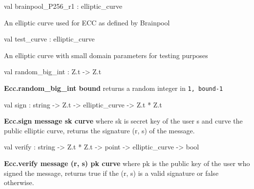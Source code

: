 \documentclass[12pt]{article}
\begin{document}
\begin{ocamldocsigend}
\label{val:Ecc.Ecc.brainpool-underscoreP256-underscorer1}\begin{ocamldoccode}
val brainpool_P256_r1 : elliptic_curve
\end{ocamldoccode}
\begin{ocamldocdescription}
An elliptic curve used for ECC as defined by Brainpool


\end{ocamldocdescription}


\label{val:Ecc.Ecc.test-underscorecurve}\begin{ocamldoccode}
val test_curve : elliptic_curve
\end{ocamldoccode}
\begin{ocamldocdescription}
An elliptic curve with small domain parameters for testing purposes


\end{ocamldocdescription}


\label{val:Ecc.Ecc.random-underscorebig-underscoreint}\begin{ocamldoccode}
val random_big_int : Z.t -> Z.t
\end{ocamldoccode}
\begin{ocamldocdescription}
\textbf{Ecc.random\_big\_int bound} returns a random integer in {\tt{1, bound-1}}


\end{ocamldocdescription}


\label{val:Ecc.Ecc.sign}\begin{ocamldoccode}
val sign : string -> Z.t -> elliptic_curve -> Z.t * Z.t
\end{ocamldoccode}
\begin{ocamldocdescription}
\textbf{Ecc.sign message sk curve} where sk is secret key of the user s and curve 
       the public elliptic curve, returns the signature (r, s) of the message.


\end{ocamldocdescription}


\label{val:Ecc.Ecc.verify}\begin{ocamldoccode}
val verify : string -> Z.t * Z.t -> point -> elliptic_curve -> bool
\end{ocamldoccode}
\begin{ocamldocdescription}
\textbf{Ecc.verify message (r, s) pk curve} where pk is the public key of the user
       who signed the message, returns true if the (r, s) is a valid
       signature or false otherwise.



\end{ocamldocdescription}
\end{ocamldocsigend}
\end{document}
